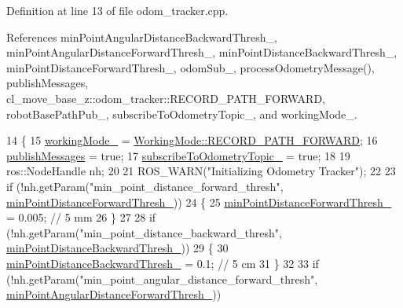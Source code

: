 Definition at line 13 of file odom\+\_\+tracker.\+cpp.



References min\+Point\+Angular\+Distance\+Backward\+Thresh\+\_\+, min\+Point\+Angular\+Distance\+Forward\+Thresh\+\_\+, min\+Point\+Distance\+Backward\+Thresh\+\_\+, min\+Point\+Distance\+Forward\+Thresh\+\_\+, odom\+Sub\+\_\+, process\+Odometry\+Message(), publish\+Messages, cl\+\_\+move\+\_\+base\+\_\+z\+::odom\+\_\+tracker\+::\+R\+E\+C\+O\+R\+D\+\_\+\+P\+A\+T\+H\+\_\+\+F\+O\+R\+W\+A\+RD, robot\+Base\+Path\+Pub\+\_\+, subscribe\+To\+Odometry\+Topic\+\_\+, and working\+Mode\+\_\+.


\begin{DoxyCode}
14 \{
15     \hyperlink{classcl__move__base__z_1_1odom__tracker_1_1OdomTracker_a5ae598c85c4469f4c0e984480575c42b}{workingMode\_} = \hyperlink{namespacecl__move__base__z_1_1odom__tracker_ac46b05813b2791604f6cd0a39ace3ef8a989d06a586bcf9520889228da7faa643}{WorkingMode::RECORD\_PATH\_FORWARD};
16     \hyperlink{classcl__move__base__z_1_1odom__tracker_1_1OdomTracker_a4f253d45ab5750dee3c2f18dd5599725}{publishMessages} = \textcolor{keyword}{true};
17     \hyperlink{classcl__move__base__z_1_1odom__tracker_1_1OdomTracker_afbe614b53a1493eb8268b8ea65b5b93a}{subscribeToOdometryTopic\_} = \textcolor{keyword}{true};
18 
19     ros::NodeHandle nh;
20 
21     ROS\_WARN(\textcolor{stringliteral}{"Initializing Odometry Tracker"});
22 
23     \textcolor{keywordflow}{if} (!nh.getParam(\textcolor{stringliteral}{"min\_point\_distance\_forward\_thresh"}, 
      \hyperlink{classcl__move__base__z_1_1odom__tracker_1_1OdomTracker_a2a11c48d1da1f1c9b921ef37c8db6325}{minPointDistanceForwardThresh\_}))
24     \{
25         \hyperlink{classcl__move__base__z_1_1odom__tracker_1_1OdomTracker_a2a11c48d1da1f1c9b921ef37c8db6325}{minPointDistanceForwardThresh\_} = 0.005; \textcolor{comment}{// 5 mm}
26     \}
27 
28     \textcolor{keywordflow}{if} (!nh.getParam(\textcolor{stringliteral}{"min\_point\_distance\_backward\_thresh"}, 
      \hyperlink{classcl__move__base__z_1_1odom__tracker_1_1OdomTracker_ac1c711aabcc005981c256f8f45c0555b}{minPointDistanceBackwardThresh\_}))
29     \{
30         \hyperlink{classcl__move__base__z_1_1odom__tracker_1_1OdomTracker_ac1c711aabcc005981c256f8f45c0555b}{minPointDistanceBackwardThresh\_} = 0.1; \textcolor{comment}{// 5 cm}
31     \}
32 
33     \textcolor{keywordflow}{if} (!nh.getParam(\textcolor{stringliteral}{"min\_point\_angular\_distance\_forward\_thresh"}, 
      \hyperlink{classcl__move__base__z_1_1odom__tracker_1_1OdomTracker_a3567ebfbc56db63e0fad52e0c4936c30}{minPointAngularDistanceForwardThresh\_}))

\end{DoxyCode}
